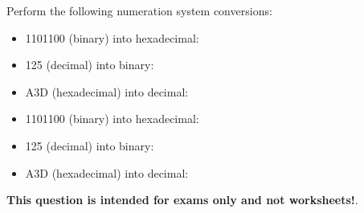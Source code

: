 

Perform the following numeration system conversions:

\begin{itemize}
\item{} 1101100 (binary) into hexadecimal: \underbar{\hskip 50pt}
\vskip 10pt
\item{} 125 (decimal) into binary: \underbar{\hskip 50pt}
\vskip 10pt
\item{} A3D (hexadecimal) into decimal: \underbar{\hskip 50pt}
\end{itemize}







\begin{itemize}
\item{} 1101100 (binary) into hexadecimal: 
\vskip 10pt
\item{} 125 (decimal) into binary: 
\vskip 10pt
\item{} A3D (hexadecimal) into decimal: 
\end{itemize}







{\bf This question is intended for exams only and not worksheets!}.




